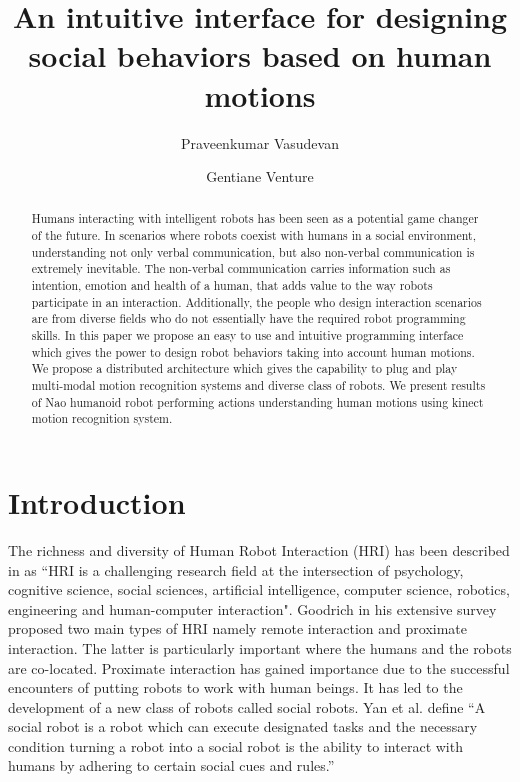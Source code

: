 \documentclass{llncs}
\title{An intuitive interface for designing social behaviors based on human motions}
\author{Praveenkumar Vasudevan\inst{1} \and Gentiane Venture\inst{2}}
\institute{Graduate Student, \'{E}cole Centrale de Nantes, Nantes, France,\\
\email{praveenv4k@gmail.com}
\and
Associate Professor, Tokyo University of Agriculture and Technology, Japan\\
\email{venture@cc.tuat.ac.jp}}
\begin{document}
\maketitle   
\begin{abstract}
	Humans interacting with intelligent robots has been seen as a potential game changer of the future. In scenarios where robots coexist with humans in a social environment, understanding not only verbal communication, but also non-verbal communication is extremely inevitable. The non-verbal communication carries information such as intention, emotion and health of a human, that adds value to the way robots participate in an interaction. Additionally, the people who design interaction scenarios are from diverse fields who do not essentially have the required robot programming skills. In this paper we propose an easy to use and intuitive programming interface which gives the power to design robot behaviors taking into account human motions. We propose a distributed architecture which gives the capability to plug and play multi-modal motion recognition systems and diverse class of robots. We present results of Nao humanoid robot performing actions understanding human motions using kinect motion recognition system.
\end{abstract}
\section{Introduction}
\quad The richness and diversity of Human Robot Interaction (HRI) has been described in \cite{dautenhahn2007methodology} as ``HRI is a challenging research field at the intersection of psychology, cognitive science, social sciences, artificial intelligence, computer science, robotics, engineering and human-computer interaction". Goodrich in his extensive survey \cite{goodrich2007human} proposed two main types of HRI namely remote interaction and proximate interaction. The latter is particularly important where the humans and the robots are co-located. Proximate interaction has gained importance due to the successful encounters of putting robots to work with human beings. It has led to the development of a new class of robots called social robots. Yan et al. \cite{yan2014survey} define ``A social robot is a robot which can execute designated tasks and the necessary condition turning a robot into a social robot is the ability to interact with humans by adhering to certain social cues and rules.''
\end{document}

